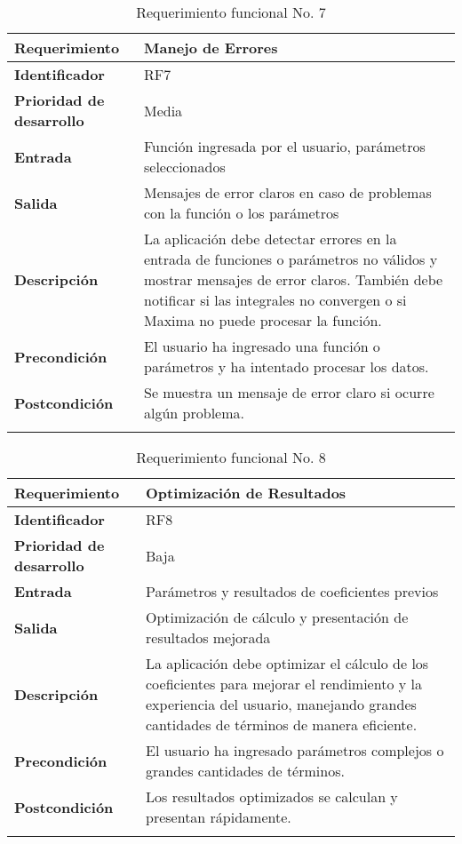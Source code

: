 \begin{longtable}{|m{3.5cm}|m{9.5cm}|}
	\hline
	\rowcolor{black!75} \color{white}\textbf{Requerimiento} & \color{white}\textbf{Manejo de Errores} \\
	\hline
	\textbf{Identificador} & RF7 \\
	\hline
	\textbf{Prioridad de desarrollo} & Media \\
	\hline
	\textbf{Entrada} & Función ingresada por el usuario, parámetros seleccionados \\
	\hline
	\textbf{Salida} & Mensajes de error claros en caso de problemas con la función o los parámetros \\
	\hline
	\textbf{Descripción} & La aplicación debe detectar errores en la entrada de funciones o parámetros no válidos y mostrar mensajes de error claros. También debe notificar si las integrales no convergen o si Maxima no puede procesar la función. \\
	\hline
	\textbf{Precondición} & El usuario ha ingresado una función o parámetros y ha intentado procesar los datos. \\
	\hline
	\textbf{Postcondición} & Se muestra un mensaje de error claro si ocurre algún problema. \\
	\hline
	\rowcolor{white} \caption{Requerimiento funcional No. 7} \label{tabla:RF7} \\
\end{longtable}


\begin{longtable}{|m{3.5cm}|m{9.5cm}|}
	\hline
	\rowcolor{black!75} \color{white}\textbf{Requerimiento} & \color{white}\textbf{Optimización de Resultados} \\
	\hline
	\textbf{Identificador} & RF8 \\
	\hline
	\textbf{Prioridad de desarrollo} & Baja \\
	\hline
	\textbf{Entrada} & Parámetros y resultados de coeficientes previos \\
	\hline
	\textbf{Salida} & Optimización de cálculo y presentación de resultados mejorada \\
	\hline
	\textbf{Descripción} & La aplicación debe optimizar el cálculo de los coeficientes para mejorar el rendimiento y la experiencia del usuario, manejando grandes cantidades de términos de manera eficiente. \\
	\hline
	\textbf{Precondición} & El usuario ha ingresado parámetros complejos o grandes cantidades de términos. \\
	\hline
	\textbf{Postcondición} & Los resultados optimizados se calculan y presentan rápidamente. \\
	\hline
	\rowcolor{white} \caption{Requerimiento funcional No. 8} \label{tabla:RF8} \\
\end{longtable}


